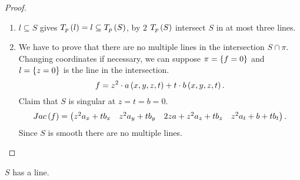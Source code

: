 \begin{proof}
\hfill
\begin{enumerate}
\item $ l \subseteq S $ gives $ T_p\left( l \right) = l \subseteq T_p\left( S \right) $, by $ 2 $ $ T_p\left( S \right) $ intersect $ S $ in at most three lines.
\item We have to prove that there are no multiple lines in the intersection $ S \cap \pi $. Changing coordinates if necessary, we can suppose $ \pi = \left\{ f = 0 \right\} $ and $ l = \left\{ z = 0 \right\} $ is the line in the intersection.
$$ f = z^2 \cdot a\left( x, y, z, t \right) + t \cdot b\left( x, y, z, t \right). $$
Claim that $ S $ is singular at $ z = t = b = 0 $.
$$ Jac\left( f \right) = \begin{pmatrix} z^2a_x + tb_x & z^2a_y + tb_y & 2za + z^2a_z + tb_z & z^2a_t + b + tb_t \end{pmatrix}. $$
Since $ S $ is smooth there are no multiple lines.
\end{enumerate}
\end{proof}

\begin{lemma}
$ S $ has a line.
\end{lemma}

